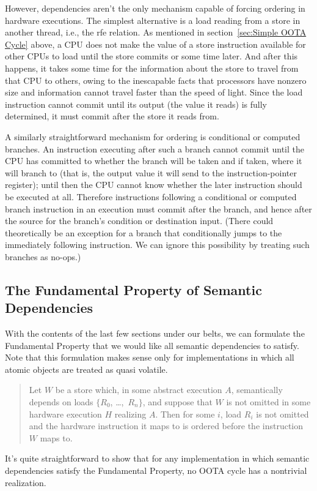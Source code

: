 \documentclass[10]{article}
\begin{document}
However, dependencies aren't the only mechanism capable of forcing
ordering in hardware executions.
The simplest alternative is a load reading from a store in another
thread, i.e., the rfe relation.
As mentioned in section~\ref{sec:Simple OOTA Cycle} above, a CPU does
not make the value of a store instruction available for other CPUs to
load until the store commits or some time later.
And after this happens, it takes some time for the information about
the store to travel from that CPU to others, owing to the inescapable
facts that processors have nonzero size and information cannot travel
faster than the speed of light.
Since the load instruction cannot commit until its output (the value it
reads) is fully determined, it must commit after the store it reads
from.

A similarly straightforward mechanism for ordering is conditional or
computed branches.
An instruction executing after such a branch cannot commit
until the CPU has committed to whether the branch will be taken and
if taken, where it will branch to (that is, the output value it will
send to the instruction-pointer register);
until then the CPU cannot know whether the later instruction should
be executed at all.
Therefore instructions following a conditional or computed branch
instruction in an execution must commit after the branch, and hence
after the source for the branch's condition or destination input.
(There could theoretically be an exception for a branch that
conditionally jumps to the immediately following instruction.
We can ignore this possibility by treating such branches as no-ops.)

\subsection{The Fundamental Property of Semantic Dependencies}
\label{sec:The Fundamental Property of Semantic Dependencies}

With the contents of the last few sections under our belts, we can
formulate the Fundamental Property that we would like all semantic
dependencies to satisfy.
Note that this formulation makes sense only for implementations in
which all atomic objects are treated as quasi volatile.
\begin{quote}
Let $W$ be a store which, in some abstract execution $A$, semantically
depends on loads $\{R_0$, \ldots,~$R_n\}$, and suppose that $W$ is not
omitted in some hardware execution $H$ realizing $A$.
Then for some $i$, load $R_i$ is not omitted and the hardware
instruction it maps to is ordered before the instruction $W$ maps to.
\end{quote}
It's quite straightforward to show that for any implementation in which
semantic dependencies satisfy the Fundamental Property, no OOTA cycle
has a nontrivial realization.
\end{document}
